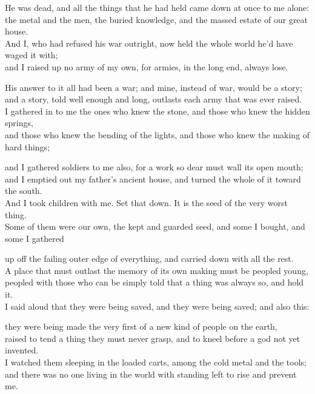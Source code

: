 \begin{scripture}
He was dead, and all the things that he had held came down at once to me alone: \\
the metal and the men, the buried knowledge, and the massed estate of our great house. \\
And I, who had refused his war outright, now held the whole world he'd have waged it with; \\
and I raised up no army of my own, for armies, in the long end, always lose. \\
\medskip

His answer to it all had been a war; and mine, instead of war, would be a story; \\
and a story, told well enough and long, outlasts each army that was ever raised. \\
I gathered in to me the ones who knew the stone, and those who knew the hidden springs, \\
and those who knew the bending of the lights, and those who knew the making of hard things; \\
\medskip

and I gathered soldiers to me also, for a work so dear must wall its open mouth; \\
and I emptied out my father's ancient house, and turned the whole of it toward the south. \\
And I took children with me. Set that down. It is the seed of the very worst thing. \\
Some of them were our own, the kept and guarded seed, and some I bought, and some I gathered \\
\medskip

up off the failing outer edge of everything, and carried down with all the rest. \\
A place that must outlast the memory of its own making must be peopled young, \\
peopled with those who can be simply told that a thing was always so, and hold it. \\
I said aloud that they were being saved, and they were being saved; and also this: \\
\medskip

they were being made the very first of a new kind of people on the earth, \\
raised to tend a thing they must never grasp, and to kneel before a god not yet invented. \\
I watched them sleeping in the loaded carts, among the cold metal and the tools; \\
and there was no one living in the world with standing left to rise and prevent me. \\
\medskip


\end{scripture}
